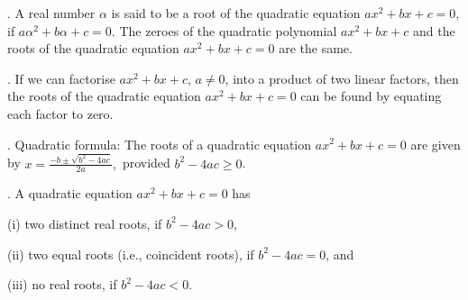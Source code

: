 \documentclass[11pt]{article}
\begin{document}
\medskip
{}. A real number $\alpha$ is said to be a root of the quadratic equation
$ax^2 + bx + c = 0$, if $a\alpha^2 + b\alpha + c = 0$.
The zeroes of the quadratic polynomial $ax^2 + bx + c$ and the roots of the
quadratic equation $ax^2 + bx + c = 0$ are the same.

\medskip
{}. If we can factorise $ax^2 + bx + c$, $a \neq 0$, into a product of two linear
factors, then the roots of the quadratic equation $ax^2 + bx + c = 0$ can be
found by equating each factor to zero.

\medskip
{}. Quadratic formula: The roots of a quadratic equation
$ax^2 + bx + c = 0$ are given by
$
x = \frac{-b \pm \sqrt{b^2 - 4ac}}{2a},
$
provided $b^2 - 4ac \geq 0$.

\medskip
{}. A quadratic equation $ax^2 + bx + c = 0$ has

\medskip
\noindent
\hspace*{1em}(i) two distinct real roots, if $b^2 - 4ac > 0$,

\medskip
\noindent
\hspace*{1em}(ii) two equal roots (i.e., coincident roots), if $b^2 - 4ac = 0$, and

\medskip
\noindent
\hspace*{1em}(iii) no real roots, if $b^2 - 4ac < 0$.
\end{document}

